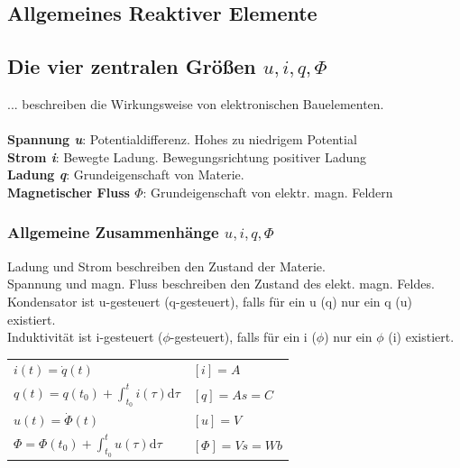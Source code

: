 \documentclass[fs, footer]{latex4ei}
\begin{document}
\begin{multicols*}{4}
    \section{Allgemeines Reaktiver Elemente}

    \subsection{Die vier zentralen Größen $u,i,q,\Phi$}
    ... beschreiben die Wirkungsweise von elektronischen Bauelementen.\\ \\
    \textbf{Spannung \textit{u}}: Potentialdifferenz. Hohes zu niedrigem Potential\\
    \textbf{Strom \textit{i}}: Bewegte Ladung. Bewegungsrichtung positiver Ladung\\
    \textbf{Ladung \textit{q}}: Grundeigenschaft von Materie.\\
    \textbf{Magnetischer Fluss \textit{$\Phi$}}: Grundeigenschaft von elektr. magn. Feldern\\
    \subsubsection{Allgemeine Zusammenhänge $u,i,q,\Phi$}
    Ladung und Strom beschreiben den Zustand der Materie.\\
    Spannung und magn. Fluss beschreiben den Zustand des elekt. magn. Feldes.\\
    Kondensator ist u-gesteuert (q-gesteuert), falls für ein u (q) nur ein q (u)  existiert. \\
    Induktivität ist i-gesteuert ($\phi$-gesteuert), falls für ein i ($\phi$) nur ein $\phi$ (i) existiert. \\
    \begin{tabular}{l|l}
        $i(t) = \dot q(t)$                                      & $[i]=A$        \\
        $q(t) = q(t_0) + \int_{t_0}^t i(\tau) \mathrm d\tau$    & $[q]=As=C$     \\ \hline
        $u(t) = \dot \Phi(t)$                                   & $[u]=V$        \\
        $\Phi = \Phi(t_0) + \int_{t_0}^t u(\tau) \mathrm d\tau$ & $[\Phi]=Vs=Wb$ \\
    \end{tabular}


\end{multicols*}
\end{document}

